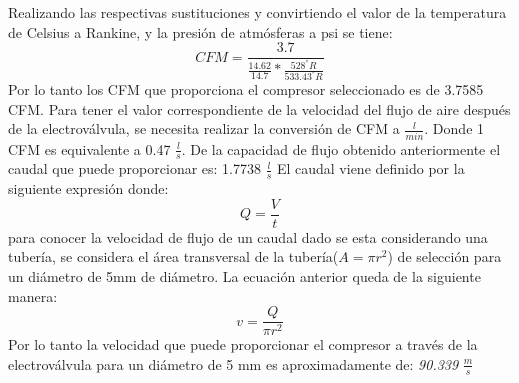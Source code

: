 Realizando las respectivas sustituciones y convirtiendo el valor de la temperatura de Celsius a  Rankine, y la presi\'on de atmósferas a psi se tiene:
\begin{equation}
	CFM=\frac{3.7}{\frac{14.62}{14.7}*\frac{528^\circ R}{533.43^\circ R}}
\end{equation}
Por lo tanto los CFM que proporciona el compresor seleccionado es de 3.7585 CFM.
\newline
Para tener el valor correspondiente de la velocidad del flujo de aire después de la electrov\'alvula, se necesita realizar la conversión de CFM a $\frac{l}{min}$. Donde 1 CFM es equivalente a 0.47 $\frac{l}{s}$. De la capacidad de flujo obtenido anteriormente el caudal que puede proporcionar es: 1.7738 $\frac{l}{s}$
\newline
El caudal viene definido por la siguiente expresi\'on donde:
\begin{equation}
	Q=\frac{V}{t}
\end{equation}
para conocer la velocidad de flujo de un caudal dado se esta considerando una tubería, se considera el área transversal de la tubería($A=\pi r^2$) de selección para un diámetro de 5mm de diámetro. 
\newline
La ecuación anterior queda de la siguiente manera: 
\begin{equation}
	v=\frac{Q}{\pi r^2}
\end{equation}
Por lo tanto la velocidad que puede proporcionar el compresor a través de la electrov\'alvula para un diámetro de 5 mm es aproximadamente de: \textit {90.339} $\frac{m}{s}$\cite{Atlas2014}